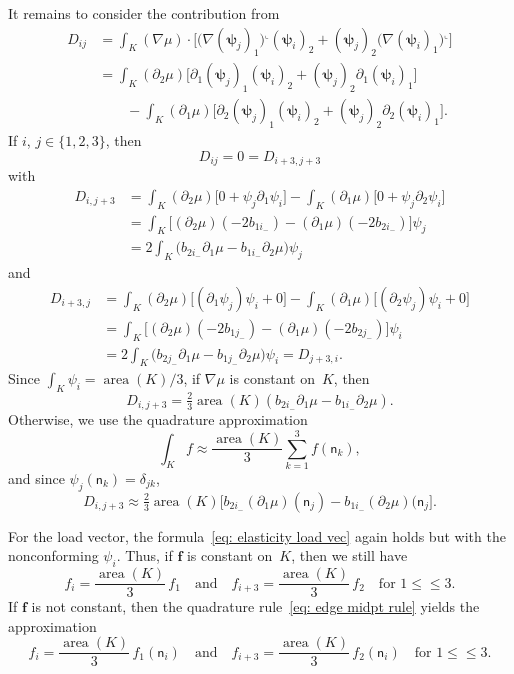 \documentclass[a4paper,12pt]{article}
\newcommand{\bs}[1]{\boldsymbol{#1}}
\newcommand{\area}{\operatorname{area}}
\newcommand{\rot}{^\llcorner}
\begin{document}
It remains to consider the contribution from
\begin{align*}
D_{ij}&=\int_K(\nabla\mu)\cdot\bigl[
     \bigl(\nabla(\bs{\psi}_j)_1\bigr)\rot(\bs{\psi}_i)_2
    +(\bs{\psi}_j)_2\bigl(\nabla(\bs{\psi}_i)_1\bigr)\rot\bigr]\\
    &=\int_K(\partial_2\mu)\bigl[\partial_1(\bs{\psi}_j)_1(\bs{\psi}_i)_2
    +(\bs{\psi}_j)_2\partial_1(\bs{\psi}_i)_1\bigr]\\
    &\qquad{}-\int_K(\partial_1\mu)\bigl[
    \partial_2(\bs{\psi}_j)_1(\bs{\psi}_i)_2
    +(\bs{\psi}_j)_2\partial_2(\bs{\psi}_i)_1\bigr].
\end{align*}
If $i$, $j\in\{1,2,3\}$, then
\[
D_{ij}=0=D_{i+3,j+3}
\]
with
\begin{align*}
D_{i,j+3}&=\int_K(\partial_2\mu)\bigl[0+\psi_j\partial_1\psi_i\bigr]
    -\int_K(\partial_1\mu)\bigl[0+\psi_j\partial_2\psi_i\bigr]\\
    &=\int_K\bigl[(\partial_2\mu)(-2b_{1i_-})-(\partial_1\mu)(-2b_{2i_-})\bigr]
    \psi_j\\
    &=2\int_K\bigl(b_{2i_-}\partial_1\mu-b_{1i_-}\partial_2\mu\bigr)\psi_j
\end{align*}
and
\begin{align*}
D_{i+3,j}&=\int_K(\partial_2\mu)\bigl[(\partial_1\psi_j)\psi_i+0\bigr]
    -\int_K(\partial_1\mu)\bigl[(\partial_2\psi_j)\psi_i+0\bigr]\\
    &=\int_K\bigl[(\partial_2\mu)(-2b_{1j_-})-(\partial_1\mu)(-2b_{2j_-})\bigr]
    \psi_i\\
    &=2\int_K\bigl(b_{2j_-}\partial_1\mu-b_{1j_-}\partial_2\mu\bigr)\psi_i
    =D_{j+3,i}.
\end{align*}
Since $\int_K\psi_i=\area(K)/3$, if $\nabla\mu$ is constant on~$K$, then
\[
D_{i,j+3}=\tfrac23\area(K)(b_{2i_-}\partial_1\mu-b_{1i_-}\partial_2\mu).
\]
Otherwise, we use the quadrature approximation
\[
\int_Kf\approx\frac{\area(K)}{3}\sum_{k=1}^3f(\mathsf{n}_k),
\]
and since $\psi_j(\mathsf{n}_k)=\delta_{jk}$,
\[
D_{i,j+3}\approx\tfrac23\area(K)\bigl[b_{2i_-}(\partial_1\mu)(\mathsf{n}_j)
    -b_{1i_-}(\partial_2\mu)(\mathsf{n}_j\bigr].
\]

For the load vector, the formula~\eqref{eq: elasticity load vec} again holds 
but with the nonconforming $\psi_i$. Thus, if $\bs{f}$ is constant on~$K$, then 
we still have
\[
f_i=\frac{\area(K)}{3}\,f_1\quad\text{and}\quad
f_{i+3}=\frac{\area(K)}{3}\,f_2\quad\text{for $1\le \le3$.}
\]
If $\bs{f}$ is not constant, then the quadrature
rule~\eqref{eq: edge midpt rule} yields the approximation
\[
f_i=\frac{\area(K)}{3}\,f_1(\mathsf{n}_i)\quad\text{and}\quad
f_{i+3}=\frac{\area(K)}{3}\,f_2(\mathsf{n}_i)\quad\text{for $1\le \le3$.}
\]
\end{document}
